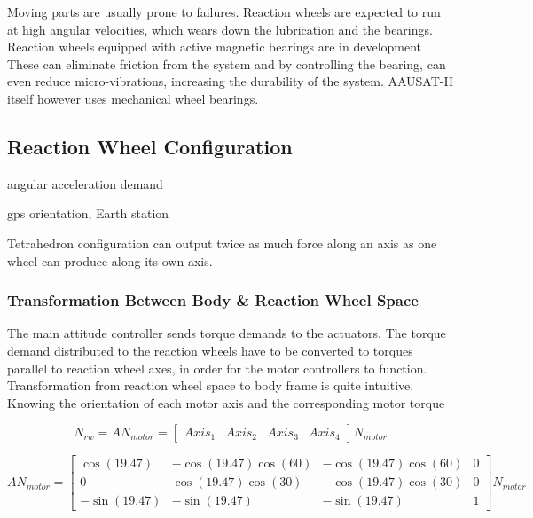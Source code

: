Moving parts are usually prone to failures. Reaction wheels are expected to run at high angular velocities, which wears down the lubrication and the bearings. Reaction wheels equipped with active magnetic bearings are in development \cite{MagneticReactWheel}. These can eliminate friction from the system and by controlling the bearing, can even reduce micro-vibrations, increasing the durability of the system. AAUSAT-II itself however uses mechanical wheel bearings.

\subsection{Reaction Wheel Configuration}

angular acceleration demand \cite{ReactionWheelConfigSim} \cite{ReactConfigThesis}

gps orientation, Earth station

Tetrahedron configuration can output twice as much force along an axis as one wheel can produce along its own axis.

\subsubsection{Transformation Between Body \& Reaction Wheel Space}

The main attitude controller sends torque demands to the actuators. The torque demand distributed to the reaction wheels have to be converted to torques parallel to reaction wheel axes, in order for the motor controllers to function. Transformation from reaction wheel space to body frame is quite intuitive. Knowing the orientation of each motor axis and the corresponding motor torque

\begin{equation}
N_{rw} = A N_{motor} = \begin{bmatrix}
Axis_{1}       & Axis_{2}  & Axis_{3}  & Axis_{4} 
\end{bmatrix} N_{motor}
\end{equation}

\begin{equation}
A N_{motor}  = 
\begin{bmatrix}
\cos(19.47)       & -\cos(19.47) \cos(60)  &  -\cos(19.47) \cos(60)  & 0 \\
0       & \cos(19.47) \cos(30)  &  -\cos(19.47) \cos(30)  & 0 \\
-\sin(19.47)       & -\sin(19.47)   &  -\sin(19.47)   & 1
\end{bmatrix} N_{motor}
\label{transmatrix}
\end{equation}

